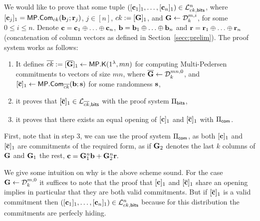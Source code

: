 We would like to prove that some tuple
$([\mathbf{c}_1]_1,\ldots, [\mathbf{c}_n]_1) \in \mathcal{L}_{ck,\mathsf{bits}}^n$, where $[\mathbf{c}_j]_1=\mathsf{MP}.\mathsf{Com}_{ck}(\mathbf{b}_j;\mathbf{r}_j)$, $j \in [n]$, $ck:=[\mathbf{{G}}]_1$, and $\mathbf{{G}} \gets \mathcal{D}_k^{m,i}$, for some $0 \leq i \leq n$. 
Denote $\mathbf{c}=\mathbf{c}_1 \oplus \ldots \oplus \mathbf{c}_n$, $\mathbf{b}=\mathbf{b}_1 \oplus \ldots \oplus \mathbf{b}_n$ and $\mathbf{r}=\mathbf{r}_1 \oplus \ldots \oplus \mathbf{r}_n$ (concatenation of column vectors as defined in Section~\ref{secc:prelim}). The proof system works as follows:
\begin{enumerate}
\item It defines  
 $\overline{ck}:=[\overline{\mathbf{{G}}}]_1\gets\mathsf{MP}.\mathsf{K}(1^\lambda,mn)$ for computing Multi-Pedersen commitments to vectors of size $mn$, where $\overline{\mathbf{{G}}} \leftarrow 
\mathcal{D}_k^{mn,0}$, and  $[{\overline{\mathbf{c}}}]_1\gets\mathsf{MP}.\mathsf{Com}_{\overline{ck}}(\mathbf{b};\mathbf{s})$ for some 
randomness $\mathbf{s}$, 
\item it proves that $[{\overline{\mathbf{c}}}]_1\in\mathcal{L}_{\overline{ck},\mathsf{bits}}$ with the proof system $\Pi_{\mathsf{bits}}$,
\item it  proves that there exists an equal opening of $[\mathbf{c}]_1$ and $[{\overline{\mathbf{c}}}]_1$ with  $\Pi_{\mathsf{com}}$.
\end{enumerate}
First, note that in step 3, we can use the proof system $\Pi_{\mathsf{com}}$, as both $[\mathbf{c}]_1$ and $[{\overline{\mathbf{c}}}]_1$ are commitments of the required form, as if $\mathbf{{G}}_2$ denotes the last $k$ columns 
of $\mathbf{{G}}$ and $\mathbf{{G}}_1$ the rest,
$\mathbf{c}=\mathbf{{G}}_1^n\mathbf{b}+\mathbf{{G}}_2^n\mathbf{r}.
$

We give some intuition on why is the above scheme sound. For the case $\mathbf{{G}} \gets \mathcal{D}_k^{m,0}$ it suffices to note that the proof that  $[\mathbf{c}]_1$ and $[{\overline{\mathbf{c}}}]_1$ share an opening implies in particular that they are both valid commitments. But if 
$[{\overline{\mathbf{c}}}]_1$ is a valid commitment then $([\mathbf{c}_1]_1,\ldots, [\mathbf{c}_n]_1) \in \mathcal{L}_{ck,\mathsf{bits}}^n$ because for this distribution the commitments are perfecly hiding. 

